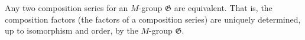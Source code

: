 Any two composition series for an $M$-group $\mathfrak{G}$ are equivalent. That is, the composition factors (the factors of a composition series) are uniquely determined, up to isomorphism and order, by the $M$-group $\mathfrak{G}$.
